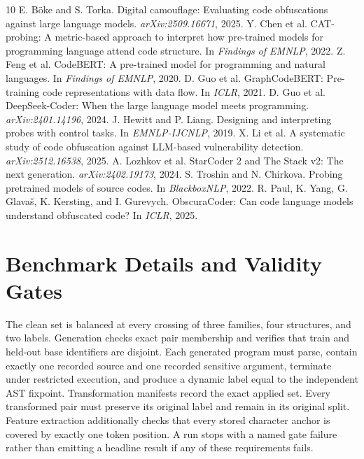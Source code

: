 \documentclass{article}
\begin{document}

\begin{thebibliography}{10}\scriptsize
{} E. B\"oke and S. Torka. Digital camouflage: Evaluating code obfuscations against large language models. \emph{arXiv:2509.16671}, 2025.
 Y. Chen et al. CAT-probing: A metric-based approach to interpret how pre-trained models for programming language attend code structure. In \emph{Findings of EMNLP}, 2022.
 Z. Feng et al. CodeBERT: A pre-trained model for programming and natural languages. In \emph{Findings of EMNLP}, 2020.
 D. Guo et al. GraphCodeBERT: Pre-training code representations with data flow. In \emph{ICLR}, 2021.
 D. Guo et al. DeepSeek-Coder: When the large language model meets programming. \emph{arXiv:2401.14196}, 2024.
 J. Hewitt and P. Liang. Designing and interpreting probes with control tasks. In \emph{EMNLP-IJCNLP}, 2019.
 X. Li et al. A systematic study of code obfuscation against LLM-based vulnerability detection. \emph{arXiv:2512.16538}, 2025.
 A. Lozhkov et al. StarCoder 2 and The Stack v2: The next generation. \emph{arXiv:2402.19173}, 2024.
 S. Troshin and N. Chirkova. Probing pretrained models of source codes. In \emph{BlackboxNLP}, 2022.
 R. Paul, K. Yang, G. Glava\v{s}, K. Kersting, and I. Gurevych. ObscuraCoder: Can code language models understand obfuscated code? In \emph{ICLR}, 2025.
\end{thebibliography}

\appendix
\section{Benchmark Details and Validity Gates}\label{app:gates}
The clean set is balanced at every crossing of three families, four structures, and two labels. Generation checks exact pair membership and verifies that train and held-out base identifiers are disjoint. Each generated program must parse, contain exactly one recorded source and one recorded sensitive argument, terminate under restricted execution, and produce a dynamic label equal to the independent AST fixpoint. Transformation manifests record the exact applied set. Every transformed pair must preserve its original label and remain in its original split. Feature extraction additionally checks that every stored character anchor is covered by exactly one token position. A run stops with a named gate failure rather than emitting a headline result if any of these requirements fails.
\end{document}

